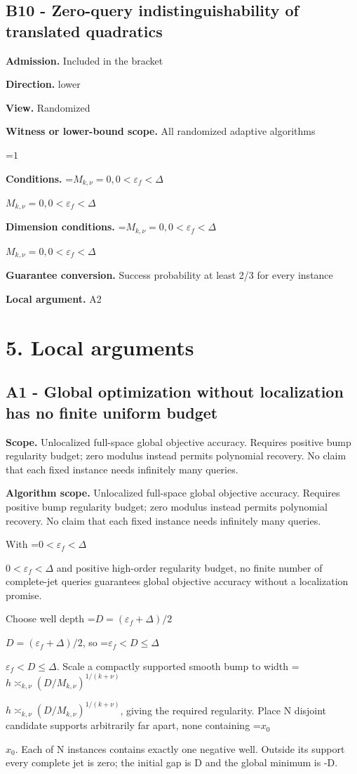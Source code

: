 \documentclass[10pt,a4paper]{article}
\newcommand{\AtlasMath}[1]{\par\begingroup\centering\setbox0=\hbox{$\displaystyle #1$}\ifdim\wd0>1.4\linewidth\typeout{ATLAS WIDE FORMULA: \the\wd0}\fi\ifdim\wd0>\linewidth\resizebox{\linewidth}{!}{\box0}\else\box0\fi\par\endgroup}
\newcommand{\AtlasInlineMath}[1]{\begingroup\setbox0=\hbox{$#1$}\ifdim\wd0>.4\linewidth\endgroup\AtlasMath{#1}\else\endgroup$#1$\fi}
\begin{document}
\subsection{B10 - Zero-query indistinguishability of translated quadratics}
\textbf{Admission.} Included in the bracket

\textbf{Direction.} lower

\textbf{View.} Randomized

\textbf{Witness or lower-bound scope.} All randomized adaptive algorithms

\AtlasMath{1}
\textbf{Conditions.} \AtlasInlineMath{M_{k,\nu}=0,0<\varepsilon_f<\Delta}

\textbf{Dimension conditions.} \AtlasInlineMath{M_{k,\nu}=0,0<\varepsilon_f<\Delta}

\textbf{Guarantee conversion.} Success probability at least 2/3 for every instance

\textbf{Local argument.} A2

\section{5. Local arguments}
\subsection{A1 - Global optimization without localization has no finite uniform budget}
\textbf{Scope.} Unlocalized full-space global objective accuracy. Requires positive bump regularity budget; zero modulus instead permits polynomial recovery. No claim that each fixed instance needs infinitely many queries.

\textbf{Algorithm scope.} Unlocalized full-space global objective accuracy. Requires positive bump regularity budget; zero modulus instead permits polynomial recovery. No claim that each fixed instance needs infinitely many queries.

With \AtlasInlineMath{0<\varepsilon_f<\Delta} and positive high-order regularity budget, no finite number of complete-jet queries guarantees global objective accuracy without a localization promise.

Choose well depth \AtlasInlineMath{D=(\varepsilon_f+\Delta)/2}, so \AtlasInlineMath{\varepsilon_f<D\le\Delta}. Scale a compactly supported smooth bump to width \AtlasInlineMath{h\asymp_{k,\nu}(D/M_{k,\nu})^{1/(k+\nu)}}, giving the required regularity. Place N disjoint candidate supports arbitrarily far apart, none containing \AtlasInlineMath{x_0}. Each of N instances contains exactly one negative well. Outside its support every complete jet is zero; the initial gap is D and the global minimum is -D.
\end{document}
